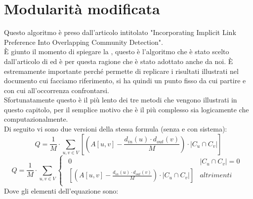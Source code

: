 \section{Modularità modificata}
Questo algoritmo\cite{M-mod_code} è preso dall'articolo intitolato "Incorporating Implicit Link Preference Into Overlapping Community Detection"\cite{M-mod_paper}.\\
È giunto il momento di spiegare la \mmod, questo è l'algoritmo che è stato scelto dall'articolo di \cnrl ed è per questa ragione che è stato adottato anche da noi. È estremamente importante perché permette di replicare i risultati illustrati nel documento cui facciamo riferimento, si ha quindi un punto fisso da cui partire e con cui all'occorrenza confrontarsi.\\
Sfortunatamente questo è il più lento dei tre metodi che vengono illustrati in questo capitolo, per il semplice motivo che è il più complesso sia logicamente che computazionalmente.\\
Di seguito vi sono due versioni della stessa formula (senza e con sistema):
\begin{equation}
	Q = \frac{1}{M} \cdot \sum_{u,v \in V}
		\left[
			\left( A \left[ u,v \right] - \frac{ d_{in}\left(u\right) \cdot d_{out}\left(v\right) }{M} \right)
			\cdot
			|C_u \cap C_v| 
		\right]
	\label{eq:m_mod}
\end{equation}
%
\begin{equation}
	Q = \frac{1}{M} \cdot \sum_{u,v \in V}
		\begin{cases}
			\begin{array}{ll}
				0 & |C_u \cap C_v| = 0 \\
				\left[ \left( A \left[ u,v \right] - \frac{ d_{in}\left(u\right) \cdot d_{out}\left(v\right) }{M} \right) \cdot |C_u \cap C_v| \right]
				& altrimenti
			\end{array}
		\end{cases}
	\label{eq:m_mod_system}
\end{equation}
Dove gli elementi dell'equazione sono:
